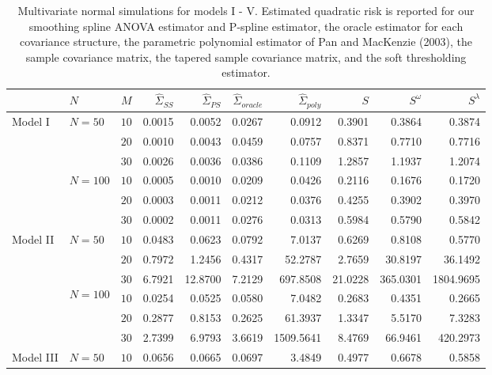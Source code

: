 \setlength{\dashlinedash}{0.5pt}
\setlength{\dashlinegap}{1pt}
\setlength{\arrayrulewidth}{0.2pt}
\begin{table}[H]
\centering
\caption{Multivariate normal simulations for models I - V. Estimated quadratic risk is 
             reported for our smoothing spline ANOVA estimator and P-spline estimator, the oracle estimator for 
             each covariance structure, the parametric polynomial estimator of Pan and MacKenzie (2003),
             the sample covariance matrix, the tapered sample covariance matrix, and the soft thresholding estimator.} 
\begin{tabular}{l|lr|rrrrrrr}
 & $N$ & $M$ &$\hat{\Sigma}_{SS}$& $\hat{\Sigma}_{PS}$ &$\hat{\Sigma}_{oracle}$& $\hat{\Sigma}_{poly}$ & $S$ &$S^\omega$& $S^\lambda$ \\ 
  \hline
Model I & $N = 50$ & $10$ & 0.0015 & 0.0052 & 0.0267 & 0.0912 & 0.3901 & 0.3864 & 0.3874 \\ 
    &   & $20$ & 0.0010 & 0.0043 & 0.0459 & 0.0757 & 0.8371 & 0.7710 & 0.7716 \\ 
    &   & $30$ & 0.0026 & 0.0036 & 0.0386 & 0.1109 & 1.2857 & 1.1937 & 1.2074 \\ 
    \hdashline
    & $N = 100$ & $10$ & 0.0005 & 0.0010 & 0.0209 & 0.0426 & 0.2116 & 0.1676 & 0.1720 \\ 
    &   & $20$ & 0.0003 & 0.0011 & 0.0212 & 0.0376 & 0.4255 & 0.3902 & 0.3970 \\ 
    &   & $30$ & 0.0002 & 0.0011 & 0.0276 & 0.0313 & 0.5984 & 0.5790 & 0.5842 \\ 
        \hdashline
            \hdashline
  Model II & $N = 50$ & $10$ & 0.0483 & 0.0623 & 0.0792 & 7.0137 & 0.6269 & 0.8108 & 0.5770 \\ 
    &   & $20$ & 0.7972 & 1.2456 & 0.4317 & 52.2787 & 2.7659 & 30.8197 & 36.1492 \\ 
    &   & $30$ & 6.7921 & 12.8700 & 7.2129 & 697.8508 & 21.0228 & 365.0301 & 1804.9695 \\ 
                \hdashline
    & $$N = 100$$ & $10$ & 0.0254 & 0.0525 & 0.0580 & 7.0482 & 0.2683 & 0.4351 & 0.2665 \\ 
    &   & $20$ & 0.2877 & 0.8153 & 0.2625 & 61.3937 & 1.3347 & 5.5170 & 7.3283 \\ 
    &   & $30$ & 2.7399 & 6.9793 & 3.6619 & 1509.5641 & 8.4769 & 66.9461 & 420.2973 \\ 
            \hdashline
            \hdashline
  Model III & $N = 50$ & $10$ & 0.0656 & 0.0665 & 0.0697 & 3.4849 & 0.4977 & 0.6678 & 0.5858 \\ 

\end{tabular}
\end{table}
